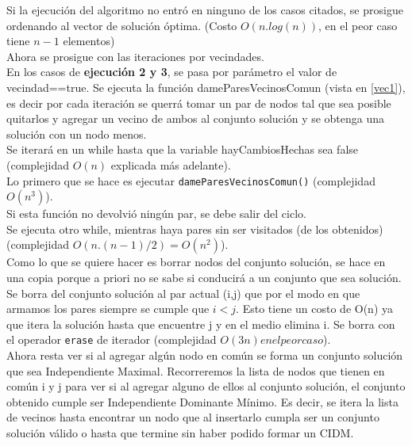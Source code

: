 Si la ejecuci\'on del algoritmo no entr\'o en ninguno de los casos citados, se prosigue ordenando al vector de soluci\'on \'optima. (Costo $O(n.log(n))$, en el peor caso tiene $n-1$ elementos)\\

Ahora se prosigue con las iteraciones por vecindades.\\

En los casos de \textbf{ejecuci\'on 2 y 3}, se pasa por par\'ametro el valor de vecindad==true. Se ejecuta la funci\'on dameParesVecinosComun (vista en \ref{vec1}), es decir por cada iteraci\'on se querr\'a tomar un par de nodos tal que sea posible quitarlos y agregar un vecino de ambos al conjunto soluci\'on y se obtenga una soluci\'on con un nodo menos.\\

Se iterar\'a en un while hasta que la variable hayCambiosHechas sea false (complejidad $O(n)$ explicada m\'as adelante).\\

Lo primero que se hace es ejecutar \texttt{dameParesVecinosComun()} (complejidad $O(n^3)$).\\

Si esta funci\'on no devolvi\'o ning\'un par, se debe salir del ciclo.\\

Se ejecuta otro while, mientras haya pares sin ser visitados (de los obtenidos) (complejidad $O(n.(n-1)/2) = O(n^2)$).\\

Como lo que se quiere hacer es borrar nodos del conjunto soluci\'on, se hace en una copia porque a priori no se sabe si conducir\'a a un conjunto que sea soluci\'on.\\

Se borra del conjunto soluci\'on al par actual (i,j) que por el modo en que armamos los pares siempre se cumple que $i<j$. Esto tiene un costo de O(n) ya que itera la soluci\'on hasta que encuentre j y en el medio elimina i. Se borra con el operador \texttt{erase} de iterador (complejidad $O(3n) en el peor caso$).\\

Ahora resta ver si al agregar alg\'un nodo en com\'un se forma un conjunto soluci\'on que sea Independiente Maximal. Recorreremos la lista de nodos que tienen en com\'un i y j para ver si al agregar alguno de ellos al conjunto soluci\'on, el conjunto obtenido cumple ser Independiente Dominante M\'inimo. Es decir, se itera la lista de vecinos hasta encontrar un nodo que al insertarlo cumpla ser un conjunto soluci\'on v\'alido o hasta que termine sin haber podido formar un CIDM.\\

